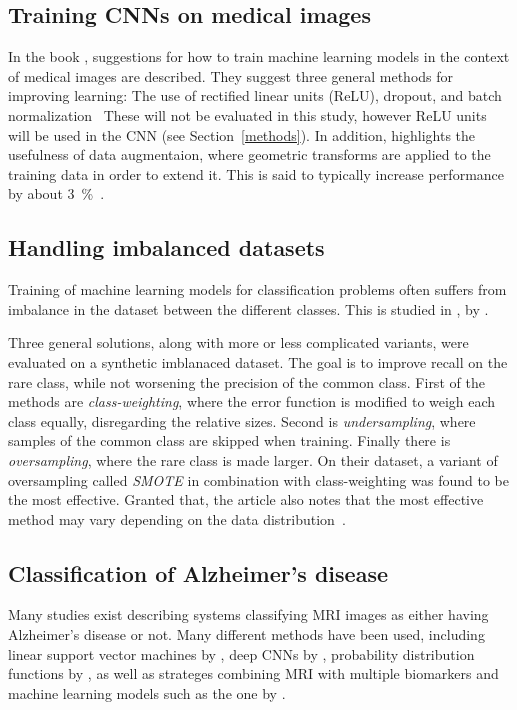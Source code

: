 \documentclass{kththesis}
\begin{document}
\subsection{Training CNNs on medical images}
In the book , suggestions for how to train machine learning models in the context of medical images are described. They suggest three general methods for improving learning: The use of rectified linear units (ReLU), dropout, and batch normalization~\cite[p. 20-22]{deepmedical} These will not be evaluated in this study, however ReLU units will be used in the CNN (see Section~\ref{methods}).
In addition,  highlights the usefulness of data augmentaion, where geometric transforms are applied to the training data in order to extend it. This is said to typically increase performance by about 3~\%~\cite[p. 31]{deepmedical}.

\subsection{Handling imbalanced datasets}
Training of machine learning models for classification problems often suffers from imbalance in the dataset between the different classes. This is studied in , by \textcite{more2016survey}.

Three general solutions, along with more or less complicated variants, were evaluated on a synthetic imblanaced dataset. The goal is to improve recall on the rare class, while not worsening the precision of the common class. First of the methods are \textit{class-weighting}, where the error function is modified to weigh each class equally, disregarding the relative sizes. Second is \textit{undersampling}, where samples of the common class are skipped when training. Finally there is \textit{oversampling}, where the rare class is made larger. On their dataset, a variant of oversampling called \textit{SMOTE} in combination with class-weighting was found to be the most effective. Granted that, the article also notes that the most effective method may vary depending on the data distribution~\cite{more2016survey}.

\subsection{Classification of Alzheimer's disease}
Many studies exist describing systems classifying MRI images as either having Alzheimer's disease or not. Many different methods have been used, including linear support vector machines by \textcite{cuingnet2011automatic}, deep CNNs by \textcite{sarraf070441}, probability distribution functions by \textcite{beheshti2015probability}, as well as strateges combining MRI with multiple biomarkers and machine learning models such as the one by \textcite{zhang2011multimodal}.
\end{document}
